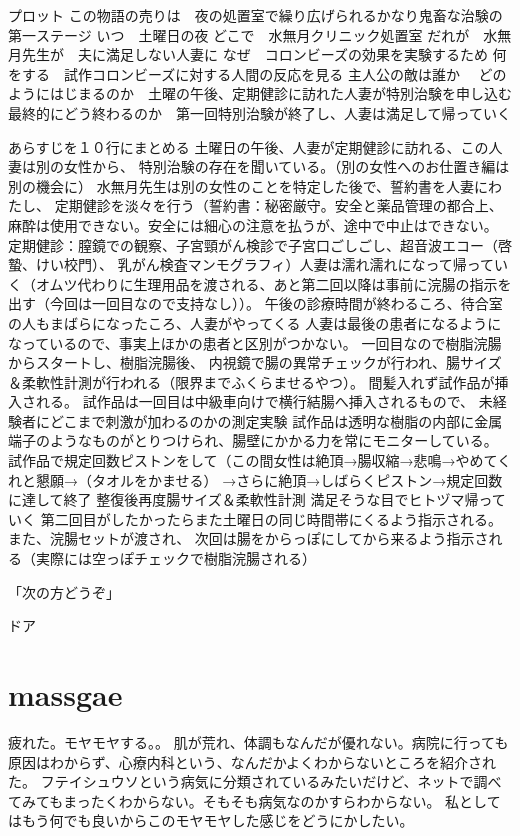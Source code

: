 プロット
この物語の売りは　夜の処置室で繰り広げられるかなり鬼畜な治験の第一ステージ
いつ　土曜日の夜
どこで　水無月クリニック処置室
だれが　水無月先生が　夫に満足しない人妻に
なぜ　コロンビーズの効果を実験するため
何をする　試作コロンビーズに対する人間の反応を見る
主人公の敵は誰か　
どのようにはじまるのか　土曜の午後、定期健診に訪れた人妻が特別治験を申し込む
最終的にどう終わるのか　第一回特別治験が終了し、人妻は満足して帰っていく

あらすじを１０行にまとめる
土曜日の午後、人妻が定期健診に訪れる、この人妻は別の女性から、
特別治験の存在を聞いている。（別の女性へのお仕置き編は別の機会に）
水無月先生は別の女性のことを特定した後で、誓約書を人妻にわたし、
定期健診を淡々を行う（誓約書：秘密厳守。安全と薬品管理の都合上、
麻酔は使用できない。安全には細心の注意を払うが、途中で中止はできない。
定期健診：膣鏡での観察、子宮頸がん検診で子宮口ごしごし、超音波エコー（啓蟄、けい校門）、
乳がん検査マンモグラフィ）人妻は濡れ濡れになって帰っていく（オムツ代わりに生理用品を渡される、あと第二回以降は事前に浣腸の指示を出す（今回は一回目なので支持なし））。
午後の診療時間が終わるころ、待合室の人もまばらになったころ、人妻がやってくる
人妻は最後の患者になるようになっているので、事実上ほかの患者と区別がつかない。
一回目なので樹脂浣腸からスタートし、樹脂浣腸後、
内視鏡で腸の異常チェックが行われ、腸サイズ＆柔軟性計測が行われる（限界までふくらませるやつ）。
間髪入れず試作品が挿入される。
試作品は一回目は中級車向けで横行結腸へ挿入されるもので、
未経験者にどこまで刺激が加わるのかの測定実験
試作品は透明な樹脂の内部に金属端子のようなものがとりつけられ、腸壁にかかる力を常にモニターしている。
試作品で規定回数ピストンをして（この間女性は絶頂→腸収縮→悲鳴→やめてくれと懇願→（タオルをかませる）
→さらに絶頂→しばらくピストン→規定回数に達して終了
整復後再度腸サイズ＆柔軟性計測
満足そうな目でヒトヅマ帰っていく
第二回目がしたかったらまた土曜日の同じ時間帯にくるよう指示される。また、浣腸セットが渡され、
次回は腸をからっぽにしてから来るよう指示される（実際には空っぽチェックで樹脂浣腸される）



「次の方どうぞ」

ドア


\section{massgae}



疲れた。モヤモヤする。。
肌が荒れ、体調もなんだが優れない。病院に行っても原因はわからず、心療内科という、なんだかよくわからないところを紹介された。
フテイシュウソという病気に分類されているみたいだけど、ネットで調べてみてもまったくわからない。そもそも病気なのかすらわからない。
私としてはもう何でも良いからこのモヤモヤした感じをどうにかしたい。

